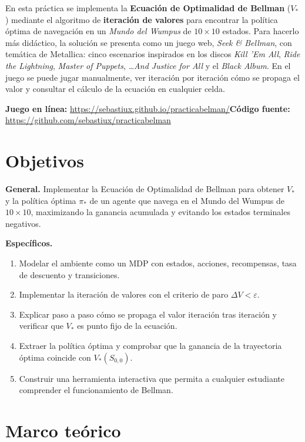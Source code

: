 \documentclass[11pt,letterpaper]{article}
\newcommand{\juego}{\url{https://sebastiux.github.io/practicabelman/}}
\newcommand{\repo}{\url{https://github.com/sebastiux/practicabelman}}
\begin{document}
En esta práctica se implementa la \textbf{Ecuación de Optimalidad de Bellman} ($V_*$) mediante el algoritmo de \textbf{iteración de valores} para encontrar la política óptima de navegación en un \emph{Mundo del Wumpus} de $10 \times 10$ estados. Para hacerlo más didáctico, la solución se presenta como un juego web, \emph{Seek \& Bellman}, con temática de Metallica: cinco escenarios inspirados en los discos \emph{Kill 'Em All}, \emph{Ride the Lightning}, \emph{Master of Puppets}, \emph{\ldots And Justice for All} y el \emph{Black Album}. En el juego se puede jugar manualmente, ver iteración por iteración cómo se propaga el valor y consultar el cálculo de la ecuación en cualquier celda.

\begin{nota}
\textbf{Juego en línea:} \juego\qquad \textbf{Código fuente:} \repo
\end{nota}

\section{Objetivos}

\textbf{General.} Implementar la Ecuación de Optimalidad de Bellman para obtener $V_*$ y la política óptima $\pi_*$ de un agente que navega en el Mundo del Wumpus de $10\times10$, maximizando la ganancia acumulada y evitando los estados terminales negativos.

\textbf{Específicos.}
\begin{enumerate}[leftmargin=*]
  \item Modelar el ambiente como un MDP con estados, acciones, recompensas, tasa de descuento y transiciones.
  \item Implementar la iteración de valores con el criterio de paro $\Delta V < \varepsilon$.
  \item Explicar paso a paso cómo se propaga el valor iteración tras iteración y verificar que $V_*$ es punto fijo de la ecuación.
  \item Extraer la política óptima y comprobar que la ganancia de la trayectoria óptima coincide con $V_*(S_{0,0})$.
  \item Construir una herramienta interactiva que permita a cualquier estudiante comprender el funcionamiento de Bellman.
\end{enumerate}

\section{Marco teórico}
\end{document}

